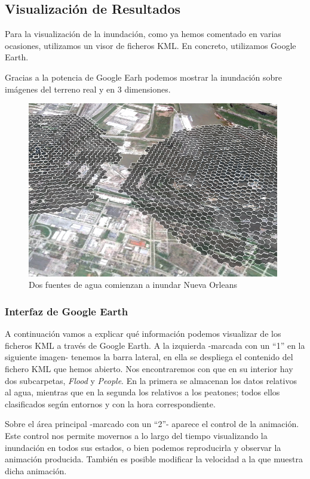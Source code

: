 \subsection{Visualización de Resultados}

Para la visualización de la inundación, como ya hemos comentado en varias
ocasiones, utilizamos un visor de ficheros KML. En concreto, utilizamos Google
Earth.

Gracias a la potencia de Google Earh podemos mostrar la inundación sobre
imágenes del terreno real y en 3 dimensiones.

\begin{figure}[H]
 \centering
 \includegraphics[width=110mm]{figuras/cap6/resultados/ejemplo.png}
 \caption{Dos fuentes de agua comienzan a inundar Nueva Orleans}
\end{figure}

\subsubsection{Interfaz de Google Earth}

A continuación vamos a explicar qué información podemos visualizar de los
ficheros KML a través de Google Earth. A la izquierda -marcada con un ``1'' en
la siguiente imagen- tenemos la barra lateral, en ella se despliega el
contenido del fichero KML que hemos abierto. Nos encontraremos con que en su
interior hay dos subcarpetas, {\em Flood} y {\em People}. En la primera se
almacenan los datos relativos al agua, mientras que en la segunda los relativos
a los peatones; todos ellos clasificados según entornos y con la hora
correspondiente.

Sobre el área principal -marcado con un ``2''- aparece el control de la
animación. Este control nos permite movernos a lo largo del tiempo visualizando
la inundación en todos sus estados, o bien podemos reproducirla y observar la
animación producida. También es posible modificar la velocidad a la que
muestra dicha animación.

